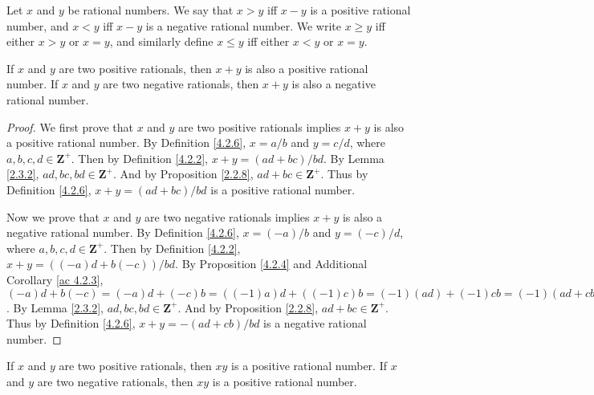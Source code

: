 \begin{definition}\label{4.2.8}
Let \(x\) and \(y\) be rational numbers.
We say that \(x > y\) iff \(x - y\) is a positive rational number, and \(x < y\) iff \(x - y\) is a negative rational number.
We write \(x \geq y\) iff either \(x > y\) or \(x = y\), and similarly define \(x \leq y\) iff either \(x < y\) or \(x = y\).
\end{definition}

\begin{additional corollary}\label{ac 4.2.4}
If \(x\) and \(y\) are two positive rationals, then \(x + y\) is also a positive rational number.
If \(x\) and \(y\) are two negative rationals, then \(x + y\) is also a negative rational number.
\end{additional corollary}

\begin{proof}
We first prove that \(x\) and \(y\) are two positive rationals implies \(x + y\) is also a positive rational number.
By Definition \ref{4.2.6}, \(x = a / b\) and \(y = c / d\), where \(a, b, c, d \in \mathbf{Z}^+\).
Then by Definition \ref{4.2.2}, \(x + y = (ad + bc) / bd\).
By Lemma \ref{2.3.2}, \(ad, bc, bd \in \mathbf{Z}^+\).
And by Proposition \ref{2.2.8}, \(ad + bc \in \mathbf{Z}^+\).
Thus by Definition \ref{4.2.6}, \(x + y = (ad + bc) / bd\) is a positive rational number.

Now we prove that \(x\) and \(y\) are two negative rationals implies \(x + y\) is also a negative rational number.
By Definition \ref{4.2.6}, \(x = (-a) / b\) and \(y = (-c) / d\), where \(a, b, c, d \in \mathbf{Z}^+\).
Then by Definition \ref{4.2.2}, \(x + y = ((-a)d + b(-c)) / bd\).
By Proposition \ref{4.2.4} and Additional Corollary \ref{ac 4.2.3}, \((-a)d + b(-c) = (-a)d + (-c)b = ((-1)a)d + ((-1)c)b = (-1)(ad) + (-1)cb = (-1)(ad + cb) = -(ad + cb)\).
By Lemma \ref{2.3.2}, \(ad, bc, bd \in \mathbf{Z}^+\).
And by Proposition \ref{2.2.8}, \(ad + bc \in \mathbf{Z}^+\).
Thus by Definition \ref{4.2.6}, \(x + y = -(ad + cb) / bd\) is a negative rational number.
\end{proof}

\begin{additional corollary}\label{ac 4.2.5}
If \(x\) and \(y\) are two positive rationals, then \(xy\) is a positive rational number.
If \(x\) and \(y\) are two negative rationals, then \(xy\) is a positive rational number.
\end{additional corollary}

